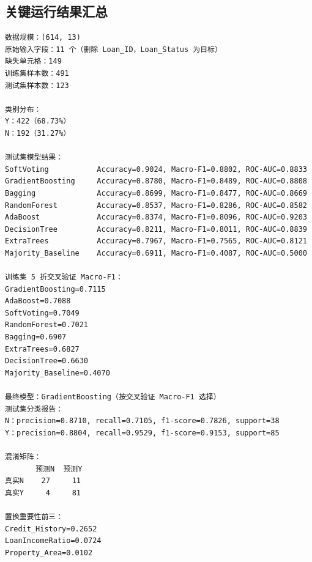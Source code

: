 \documentclass[UTF8,a4paper,12pt]{ctexart}
\begin{document}
\clearpage
\subsection*{关键运行结果汇总}

\begin{Verbatim}[breaklines,breakanywhere,fontsize=\footnotesize,frame=single,rulecolor=\color{gray!45}]
数据规模：(614, 13)
原始输入字段：11 个（删除 Loan_ID，Loan_Status 为目标）
缺失单元格：149
训练集样本数：491
测试集样本数：123

类别分布：
Y：422（68.73%）
N：192（31.27%）

测试集模型结果：
SoftVoting           Accuracy=0.9024, Macro-F1=0.8802, ROC-AUC=0.8833
GradientBoosting     Accuracy=0.8780, Macro-F1=0.8489, ROC-AUC=0.8808
Bagging              Accuracy=0.8699, Macro-F1=0.8477, ROC-AUC=0.8669
RandomForest         Accuracy=0.8537, Macro-F1=0.8286, ROC-AUC=0.8582
AdaBoost             Accuracy=0.8374, Macro-F1=0.8096, ROC-AUC=0.9203
DecisionTree         Accuracy=0.8211, Macro-F1=0.8011, ROC-AUC=0.8839
ExtraTrees           Accuracy=0.7967, Macro-F1=0.7565, ROC-AUC=0.8121
Majority_Baseline    Accuracy=0.6911, Macro-F1=0.4087, ROC-AUC=0.5000

训练集 5 折交叉验证 Macro-F1：
GradientBoosting=0.7115
AdaBoost=0.7088
SoftVoting=0.7049
RandomForest=0.7021
Bagging=0.6907
ExtraTrees=0.6827
DecisionTree=0.6630
Majority_Baseline=0.4070

最终模型：GradientBoosting（按交叉验证 Macro-F1 选择）
测试集分类报告：
N：precision=0.8710, recall=0.7105, f1-score=0.7826, support=38
Y：precision=0.8804, recall=0.9529, f1-score=0.9153, support=85

混淆矩阵：
       预测N  预测Y
真实N    27     11
真实Y     4     81

置换重要性前三：
Credit_History=0.2652
LoanIncomeRatio=0.0724
Property_Area=0.0102
\end{Verbatim}
\end{document}
